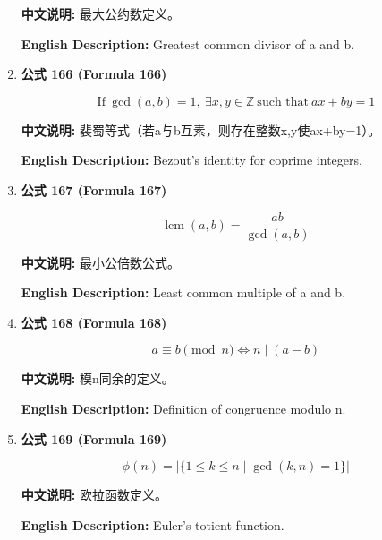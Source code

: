 \documentclass[12pt,a4paper]{article}
\begin{document}
\begin{enumerate}[leftmargin=*]
\textbf{中文说明:} 最大公约数定义。

\textbf{English Description:} Greatest common divisor of a and b.

\vspace{0.5cm}

\item \textbf{公式 166 (Formula 166)}

\begin{equation}
\text{If}\ \gcd(a, b) = 1,\ \exists x, y \in \mathbb{Z}\ \text{such that}\ ax + by = 1
\end{equation}

\textbf{中文说明:} 裴蜀等式（若a与b互素，则存在整数x,y使ax+by=1）。

\textbf{English Description:} Bezout's identity for coprime integers.

\vspace{0.5cm}

\item \textbf{公式 167 (Formula 167)}

\begin{equation}
\operatorname{lcm}(a, b) = \frac{ab}{\gcd(a, b)}
\end{equation}

\textbf{中文说明:} 最小公倍数公式。

\textbf{English Description:} Least common multiple of a and b.

\vspace{0.5cm}

\item \textbf{公式 168 (Formula 168)}

\begin{equation}
a \equiv b \pmod{n} \iff n \mid (a-b)
\end{equation}

\textbf{中文说明:} 模n同余的定义。

\textbf{English Description:} Definition of congruence modulo n.

\vspace{0.5cm}

\item \textbf{公式 169 (Formula 169)}

\begin{equation}
\phi(n) = |\{1 \leq k \leq n\mid \gcd(k,n) = 1\}|
\end{equation}

\textbf{中文说明:} 欧拉函数定义。

\textbf{English Description:} Euler's totient function.


\end{enumerate}
\end{document}
